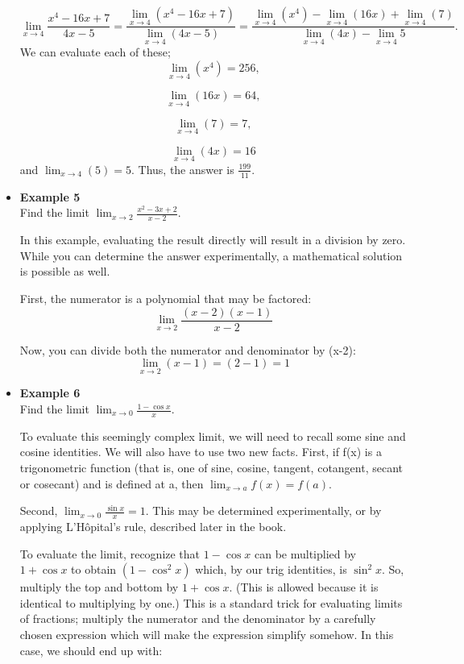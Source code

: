 \documentclass[]{article}
\begin{document}
\begin{itemize}
	\[\lim_{x\to 4}\frac{x^4 - 16x + 7}{4x-5} = \frac{\lim_{x\to 4} (x^4 - 16x + 7)} {\lim_{x\to 4} (4x-5)} = \frac{\lim_{x\to 4} (x^4) - \lim_{x\to 4} (16x) + \lim_{x\to 4} (7)} {\lim_{x\to 4} (4x) - \lim_{x\to 4} 5}.\]
	We can evaluate each of these; 
	\[\lim_{x\to 4} (x^4) = 256,\]
	
	\[\lim_{x\to 4} (16x) = 64,\]
	
	\[\lim_{x\to 4} (7) = 7,\]
	
	\[\lim_{x\to 4} (4x) = 16\]
	and  $\lim_{x\to 4} (5) = 5$. Thus, the answer is $\frac{199}{11}$.
	
	\item \textbf{Example 5} \\
	Find the limit $\lim_{x\to 2}\frac{x^2 - 3x + 2}{x-2}.$
	
	In this example, evaluating the result directly will result in a division by zero. While you can determine the answer experimentally, a mathematical solution is possible as well.
	
	First, the numerator is a polynomial that may be factored: \[\lim_{x\to 2}\frac{(x-2)(x-1)}{x-2}\]
	
	Now, you can divide both the numerator and denominator by (x-2): \[\lim_{x\to 2} (x-1) = (2-1) = 1\]
	
	
	
	\item \textbf{Example 6} \\
	Find the limit $\lim_{x\to 0}\frac{1-\cos x}{x}$.
	
	To evaluate this seemingly complex limit, we will need to recall some sine and cosine identities. We will also have to use two new facts. First, if f(x) is a trigonometric function (that is, one of sine, cosine, tangent, cotangent, secant or cosecant) and is defined at a, then  $\lim_{x\to a} f(x) = f(a)$.
	
	Second, $\lim_{x\to 0}\frac{\sin x}{x} = 1$. This may be determined experimentally, or by applying L'Hôpital's rule, described later in the book.
	
	To evaluate the limit, recognize that  $1 - \cos x$ can be multiplied by  $1+\cos x$ to obtain  $(1-\cos^2 x)$ which, by our trig identities, is  $\sin^2 x$. So, multiply the top and bottom by  $1+\cos x$. (This is allowed because it is identical to multiplying by one.) This is a standard trick for evaluating limits of fractions; multiply the numerator and the denominator by a carefully chosen expression which will make the expression simplify somehow. In this case, we should end up with:
	

\end{itemize}
\end{document}
